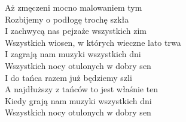 \begin{flushleft}
\hspace{0.9cm}Aż zmęczeni mocno malowaniem tym \\
\hspace{0.9cm}Rozbijemy o podłogę trochę szkła \\
\hspace{0.9cm}I zachwycą nas pejzaże wszystkich zim \\
\hspace{0.9cm}Wszystkich wiosen, w których wieczne lato trwa \\
\hspace{0.9cm}I zagrają nam muzyki wszystkich dni  \\
\hspace{0.9cm}Wszystkich nocy otulonych w dobry sen  \\
\hspace{0.9cm}I do tańca razem już będziemy szli  \\
\hspace{0.9cm}A najdłuższy z tańców to jest właśnie ten  \\
\hspace{0.9cm}Kiedy grają nam muzyki wszystkich dni  \\
\hspace{0.9cm}Wszystkich nocy otulonych w dobry sen \\
\vskip 3mm
\end{flushleft}
\clearpage
